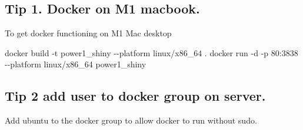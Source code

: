 \documentclass[
  letterpaper,
  DIV=11,
  numbers=noendperiod,
  oneside]{scrartcl}
\newenvironment{Shaded}{\begin{snugshade}}{\end{snugshade}}
\newcommand{\AttributeTok}[1]{\textcolor[rgb]{0.40,0.45,0.13}{#1}}
\newcommand{\CommentTok}[1]{\textcolor[rgb]{0.37,0.37,0.37}{#1}}
\newcommand{\ErrorTok}[1]{\textcolor[rgb]{0.68,0.00,0.00}{#1}}
\newcommand{\ExtensionTok}[1]{\textcolor[rgb]{0.00,0.23,0.31}{#1}}
\newcommand{\NormalTok}[1]{\textcolor[rgb]{0.00,0.23,0.31}{#1}}
\newcommand{\OperatorTok}[1]{\textcolor[rgb]{0.37,0.37,0.37}{#1}}
\newcommand{\PreprocessorTok}[1]{\textcolor[rgb]{0.68,0.00,0.00}{#1}}
\newcommand{\VariableTok}[1]{\textcolor[rgb]{0.07,0.07,0.07}{#1}}
\begin{document}
\begin{Shaded}
\end{Shaded}

\hypertarget{tip-1.-docker-on-m1-macbook.}{%
\subsection{Tip 1. Docker on M1
macbook.}\label{tip-1.-docker-on-m1-macbook.}}

To get docker functioning on M1 Mac desktop

\begin{Shaded}
\begin{Highlighting}[]
\ExtensionTok{docker}\NormalTok{ build }\AttributeTok{{-}t}\NormalTok{ power1\_shiny }\AttributeTok{{-}{-}platform}\NormalTok{ linux/x86\_64 .}
\ExtensionTok{docker}\NormalTok{ run }\AttributeTok{{-}d} \AttributeTok{{-}p}\NormalTok{ 80:3838 }\AttributeTok{{-}{-}platform}\NormalTok{ linux/x86\_64 power1\_shiny}
\end{Highlighting}
\end{Shaded}

\hypertarget{tip-2-add-user-to-docker-group-on-server.}{%
\subsection{Tip 2 add user to docker group on
server.}\label{tip-2-add-user-to-docker-group-on-server.}}

Add ubuntu to the docker group to allow docker to run without sudo.
\end{document}
